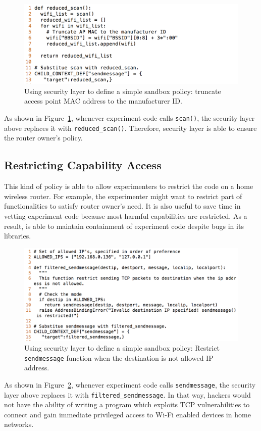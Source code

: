 \begin{figure}%
\centering
\includegraphics[width=0.8\columnwidth]{figure/example.png}
\caption{Using security layer to define a simple sandbox policy: truncate access point MAC address to the manufacturer ID.}
\label{fig-examplecode1}
\end{figure}

As shown in Figure~\ref{fig-examplecode1}, whenever experiment code calls \texttt{scan()}, the security layer above replaces it with \texttt{reduced\_scan()}. Therefore, security layer is able to ensure the router owner's policy.

\subsection{Restricting Capability Access}
This kind of policy is able to allow experimenters to restrict the code on a home wireless router. For example, the experimenter might want to restrict part of functionalities to satisfy router owner's need. It is also useful to save time in vetting experiment code because most harmful capabilities are restricted. As a result, \sysname is able to maintain containment of experiment code despite bugs in its libraries.

\begin{figure}%
\centering
\includegraphics[width=0.8\columnwidth]{figure/example-restrict_data.png}
\caption{Using security layer to define a simple sandbox policy: Restrict \texttt{sendmessage} function when the destination is not allowed IP address.}
\label{fig-examplecode2}
\end{figure}

As shown in Figure~\ref{fig-examplecode2}, whenever experiment code calls \texttt{sendmessage}, the security layer above replaces it with \texttt{filtered\_sendmessage}. In that way, hackers would not have the ability of writing a program which exploits TCP vulnerabilities to connect and gain immediate privileged access to Wi-Fi enabled devices in home networks. 

 
